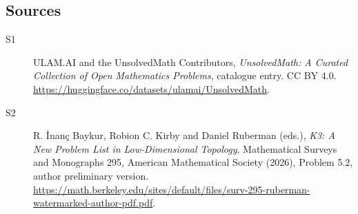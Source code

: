 \documentclass[11pt]{article}
\begin{document}
\subsection{Sources}
\begin{description}
\item[\hypertarget{source:statement:1}{S1}] ULAM.AI and the UnsolvedMath Contributors, \emph{UnsolvedMath: A Curated Collection of Open Mathematics Problems}, catalogue entry. CC BY 4.0. \url{https://huggingface.co/datasets/ulamai/UnsolvedMath}.
\item[\hypertarget{source:statement:2}{S2}] R. İnanç Baykur, Robion C. Kirby and Daniel Ruberman (eds.), \emph{K3: A New Problem List in Low-Dimensional Topology}, Mathematical Surveys and Monographs 295, American Mathematical Society (2026), Problem 5.2, author preliminary version. \url{https://math.berkeley.edu/sites/default/files/surv-295-ruberman-watermarked-author-pdf.pdf}.
\end{description}
\label{end:statement}
\end{document}
